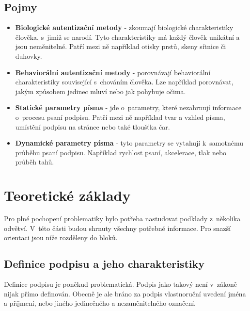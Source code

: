 \section{Pojmy}
\label{sec:pojmy}
\begin{itemize}
  \item{\textbf{Biologické autentizační metody} - zkoumají biologické charakteristiky člověka, s~jimiž se narodí. Tyto charakteristiky má každý člověk unikátní a jsou neměnitelné. Patří mezi ně například otisky prstů, skeny sítnice či duhovky.}  
  \item{\textbf{Behaviorální autentizační metody} - porovnávají behaviorální charakteristiky související s~chováním člověka. Lze například porovnávat, jakým způsobem jedinec mluví nebo jak pohybuje očima.}
  \item{\textbf{Statické parametry písma} - jde o~parametry, které nezahrnují informace o~procesu psaní podpisu. Patří mezi ně například tvar a vzhled písma, umístění podpisu na stránce nebo také tloušťka čar.}
  \item{\textbf{Dynamické parametry písma} - tyto parametry se vytahují k~samotnému průběhu psaní podpisu. Například rychlost psaní, akcelerace, tlak nebo průběh tahů.}
\end{itemize}


\chapter{Teoretické základy}
Pro plné pochopení problematiky bylo potřeba nastudovat podklady z~několika odvětví. 
V~této části budou shrnuty všechny potřebné informace. 
Pro snazší orientaci jsou níže rozděleny do bloků.

\section{Definice podpisu a jeho charakteristiky}
Definice podpisu je poněkud problematická. 
Podpis jako takový není v~zákoně nijak přímo definován. 
Obecně je ale bráno za podpis vlastnoruční uvedení jména a příjmení, nebo jiného jedinečného a nezaměnitelného označení. %

